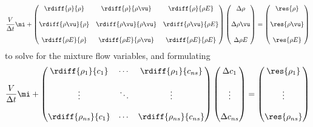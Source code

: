 \begin{equation}
  \frac{V}{\Delta t}\mi + 
  \begin{pmatrix}
    \rdiff{\rho}{\rho} & \rdiff{\rho}{\rho \vu} & \rdiff{\rho}{\rho E} \\ \\
    \rdiff{\rho \vu}{\rho} & \rdiff{\rho \vu}{\rho \vu} & \rdiff{\rho \vu}{\rho E} \\ \\
    \rdiff{\rho E}{\rho} & \rdiff{\rho E}{\rho \vu} & \rdiff{\rho E}{\rho E}
  \end{pmatrix}
  \begin{pmatrix}
    \Delta \rho \\ \\
    \Delta \rho \vu \\ \\
    \Delta \rho E
  \end{pmatrix}
  =
  \begin{pmatrix}
    \res{\rho} \\ \\
    \res{\rho \vu} \\ \\
    \res{\rho E}
  \end{pmatrix}
  \label{approx-jac}
\end{equation}
to solve for the mixture flow variables, and formulating
\begin{equation}
  \frac{V}{\Delta t}\mi + 
  \begin{pmatrix}
    \rdiff{\rho_1}{c_1} & \cdots & \rdiff{\rho_{1}}{c_{ns}} \\ \\
    \vdots & \ddots & \vdots \\ \\
    \rdiff{\rho_{ns}}{c_1} & \cdots & \rdiff{\rho_{ns}}{c_{ns}}
  \end{pmatrix}
  \begin{pmatrix}
    \Delta c_1 \\ \\
    \vdots \\ \\
    \Delta c_{ns}
  \end{pmatrix}
  =
  \begin{pmatrix}
    \res{\rho_1} \\ \\
    \vdots \\ \\
    \res{\rho_{ns}}
  \end{pmatrix}
  \label{approx-jac-dc}
\end{equation}

